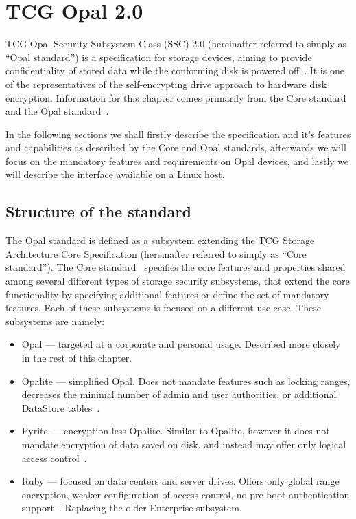 \chapter{TCG Opal 2.0}

TCG Opal Security Subsystem Class (SSC) 2.0 (hereinafter referred to simply as ``Opal standard'') is a specification for storage devices, aiming to provide confidentiality of stored data while the conforming disk is powered off~\cite{tcg-opal2}. It is one of the representatives of the self-encrypting drive approach to hardware disk encryption. 
Information for this chapter comes primarily from the Core standard~\cite{tcg-storage-core} and the Opal standard~\cite{tcg-opal2}.


In the following sections we shall firstly describe the specification and it's features and capabilities as described by the Core and Opal standards, afterwards we will focus on the mandatory features and requirements on Opal devices, and lastly we will describe the interface available on a Linux host. %

\section{Structure of the standard}

The Opal standard is defined as a subsystem extending the TCG Storage Architecture Core Specification (hereinafter referred to simply as ``Core standard''). The Core standard~\cite{tcg-storage-core} specifies the core features and properties shared among several different types of storage security subsystems, that extend the core functionality by specifying additional features or define the set of mandatory features. Each of these subsystems is focused on a different use case. These subsystems are namely: \begin{itemize}
    \item Opal --- targeted at a corporate and personal usage. Described more closely in the rest of this chapter.
    \item Opalite --- simplified Opal. Does not mandate features such as locking ranges, decreases the minimal number of admin and user authorities, or additional DataStore tables~\cite{tcg-opalite}. %
    \item Pyrite --- encryption-less Opalite. Similar to Opalite, however it does not mandate encryption of data saved on disk, and instead may offer only logical access control~\cite{tcg-pyrite}.
    \item Ruby --- focused on data centers and server drives. Offers only global range encryption, weaker configuration of access control, no pre-boot authentication support~\cite{tcg-ruby}. Replacing the older Enterprise subsystem.
\end{itemize}

